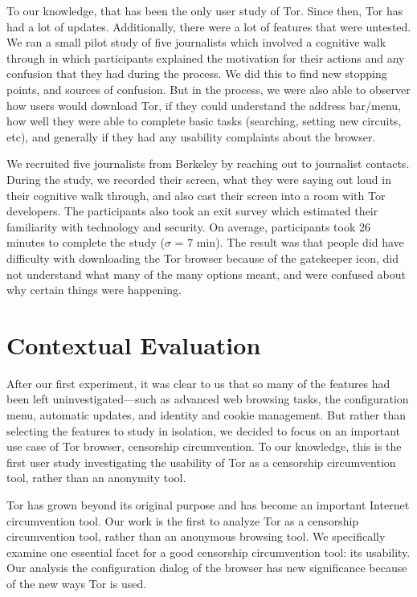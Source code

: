 \documentclass{sig-alternate-hotpets15}
\begin{document}
To our knowledge, that has been the only user study of Tor. Since then, Tor has had a lot of updates. Additionally, there were a lot of features that were untested. We ran a small pilot study of five journalists which involved a cognitive walk through in which participants explained the motivation for their actions and any confusion that they had during the process. We did this to find new stopping points, and sources of confusion. 
But in the process, we were also able to observer how users would download Tor, if they could understand the address bar/menu, how well they were able to complete basic tasks (searching, setting new circuits, etc), and generally if they had any usability complaints about the browser. 

We recruited five journalists from Berkeley by reaching out to journalist contacts. 
During the study, we recorded their screen, what they were saying out loud in their cognitive walk through, and also cast their screen into a room with Tor developers. The participants also took an exit survey which estimated their familiarity with technology and security. On average, participants took 26 minutes to complete the study ($\sigma$ = 7 min).  The result was that people did have difficulty with downloading the Tor browser because of the gatekeeper icon, did not understand what many of the many options meant, and were confused about why certain things were happening. 

\section{Contextual Evaluation} 
After our first experiment, it was clear to us that so many of the features had been left uninvestigated---such as advanced web browsing tasks, the configuration menu, automatic updates, and identity and cookie management. But rather than selecting the features to study in isolation, we decided to focus on an important use case of Tor browser, censorship circumvention. To our knowledge, this is the first user study investigating the usability of Tor as a censorship circumvention tool, rather than an anonymity tool. 

Tor has grown beyond its original purpose and has become an important Internet circumvention tool. Our work is the first to analyze Tor as a censorship circumvention tool, rather than an anonymous browsing tool. We specifically examine one  essential facet for a good censorship circumvention tool: its usability. Our analysis the configuration dialog of the browser has new significance because of the new ways Tor is used.
\end{document}
